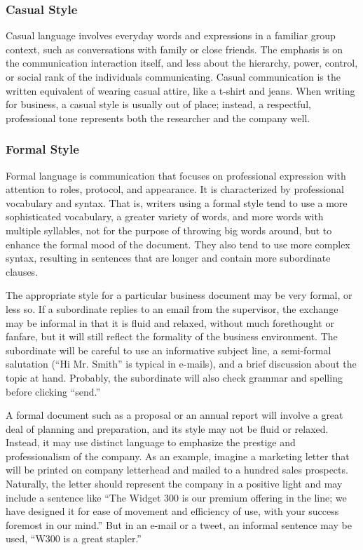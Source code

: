 \subsubsection{Casual Style}

Casual language involves everyday words and expressions in a familiar group context, such as conversations with family or close friends. The emphasis is on the communication interaction itself, and less about the hierarchy, power, control, or social rank of the individuals communicating. Casual communication is the written equivalent of wearing casual attire, like a t-shirt and jeans. When writing for business, a casual style is usually out of place; instead, a respectful, professional tone represents both the researcher and the company well.

\subsubsection{Formal Style}

Formal language is communication that focuses on professional expression with attention to roles, protocol, and appearance. It is characterized by professional vocabulary and syntax. That is, writers using a formal style tend to use a more sophisticated vocabulary, a greater variety of words, and more words with multiple syllables, not for the purpose of throwing big words around, but to enhance the formal mood of the document. They also tend to use more complex syntax, resulting in sentences that are longer and contain more subordinate clauses.

The appropriate style for a particular business document may be very formal, or less so. If a subordinate replies to an email from the supervisor, the exchange may be informal in that it is fluid and relaxed, without much forethought or fanfare, but it will still reflect the formality of the business environment. The subordinate will be careful to use an informative subject line, a semi-formal salutation (``Hi Mr. Smith'' is typical in e-mails), and a brief discussion about the topic at hand. Probably, the subordinate will also check grammar and spelling before clicking ``send.''

A formal document such as a proposal or an annual report will involve a great deal of planning and preparation, and its style may not be fluid or relaxed. Instead, it may use distinct language to emphasize the prestige and professionalism of the company. As an example, imagine a marketing letter that will be printed on company letterhead and mailed to a hundred sales prospects. Naturally, the letter should represent the company in a positive light and may include a sentence like ``The Widget 300 is our premium offering in the line; we have designed it for ease of movement and efficiency of use, with your success foremost in our mind.'' But in an e-mail or a tweet, an informal sentence may be used, ``W300 is a great stapler.''

